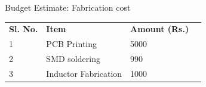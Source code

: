 \documentclass[aspectratio=169]{beamer}
\begin{document}
	
	\begin{frame}{Budget Estimate: Fabrication cost}
		\begin{table}[]
			\begin{tabular}{|l|l|l|l}
				\cline{1-3}
				\textbf{Sl. No.} & \textbf{Item}        & \textbf{Amount (Rs.)} &  \\ \cline{1-3}
				1                & PCB Printing         & 5000                    &  \\ \cline{1-3}
				2                & SMD soldering        & 990                    &  \\ \cline{1-3}
				3                & Inductor Fabrication & 1000                  &  \\ \cline{1-3}
			\end{tabular}
		\end{table}
	\end{frame}
	
	
\end{document}
